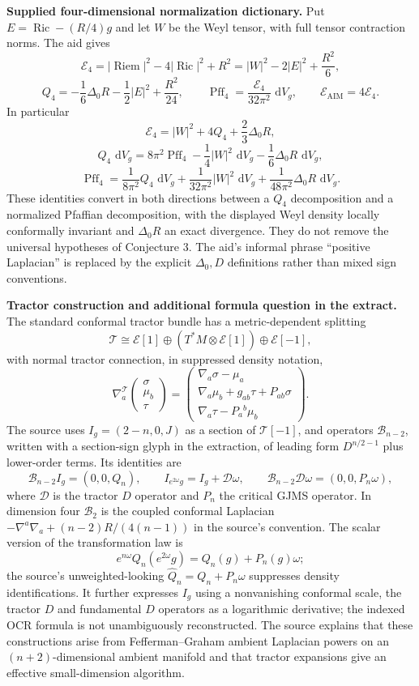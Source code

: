 \documentclass[11pt]{article}
\newcommand{\dd}{\,\mathrm{d}}
\begin{document}
\textbf{Supplied four-dimensional normalization dictionary.} Put $E=\operatorname{Ric}-(R/4)g$ and let $W$ be the Weyl tensor, with full tensor contraction norms. The aid gives
\[
 \mathcal E_4=|\operatorname{Riem}|^2-4|\operatorname{Ric}|^2+R^2
             =|W|^2-2|E|^2+\frac{R^2}{6},
\]
\[
 Q_4=-\frac16\Delta_0R-\frac12|E|^2+\frac{R^2}{24},\qquad
 \operatorname{Pff}_4=\frac{\mathcal E_4}{32\pi^2}\,\dd V_g,
 \qquad \mathcal E_{\mathrm{AIM}}=4\mathcal E_4.
\]
In particular
\[
 \mathcal E_4=|W|^2+4Q_4+\frac23\Delta_0R,
\]
\[
 Q_4\,\dd V_g=8\pi^2\operatorname{Pff}_4
       -\frac14|W|^2\,\dd V_g-\frac16\Delta_0R\,\dd V_g,
\]
\[
 \operatorname{Pff}_4=\frac1{8\pi^2}Q_4\,\dd V_g
       +\frac1{32\pi^2}|W|^2\,\dd V_g
       +\frac1{48\pi^2}\Delta_0R\,\dd V_g.
\]
These identities convert in both directions between a $Q_4$ decomposition and a normalized Pfaffian decomposition, with the displayed Weyl density locally conformally invariant and $\Delta_0R$ an exact divergence. They do not remove the universal hypotheses of Conjecture 3. The aid's informal phrase ``positive Laplacian'' is replaced by the explicit $\Delta_0,D$ definitions rather than mixed sign conventions.

\textbf{Tractor construction and additional formula question in the extract.} The standard conformal tractor bundle has a metric-dependent splitting
\[
 \mathcal T\cong\mathcal E[1]\oplus(T^*M\otimes\mathcal E[1])
                         \oplus\mathcal E[-1],
\]
with normal tractor connection, in suppressed density notation,
\[
 \nabla_a^{\mathcal T}\begin{pmatrix}\sigma\\\mu_b\\\tau\end{pmatrix}
 =\begin{pmatrix}
 \nabla_a\sigma-\mu_a\\
 \nabla_a\mu_b+g_{ab}\tau+P_{ab}\sigma\\
 \nabla_a\tau-P_a{}^b\mu_b
 \end{pmatrix}.
\]
The source uses $I_g=(2-n,0,J)$ as a section of $\mathcal T[-1]$, and operators $\mathcal B_{n-2}$, written with a section-sign glyph in the extraction, of leading form $D^{n/2-1}$ plus lower-order terms. Its identities are
\[
 \mathcal B_{n-2}I_g=(0,0,Q_n),\qquad
 I_{e^{2\omega}g}=I_g+\mathcal D\omega,\qquad
 \mathcal B_{n-2}\mathcal D\omega=(0,0,P_n\omega),
\]
where $\mathcal D$ is the tractor $D$ operator and $P_n$ the critical GJMS operator. In dimension four $\mathcal B_2$ is the coupled conformal Laplacian $-\nabla^a\nabla_a+(n-2)R/(4(n-1))$ in the source's convention. The scalar version of the transformation law is
\[
 e^{n\omega}Q_n(e^{2\omega}g)=Q_n(g)+P_n(g)\omega;
\]
the source's unweighted-looking $\widehat Q_n=Q_n+P_n\omega$ suppresses density identifications. It further expresses $I_g$ using a nonvanishing conformal scale, the tractor $D$ and fundamental $D$ operators as a logarithmic derivative; the indexed OCR formula is not unambiguously reconstructed. The source explains that these constructions arise from Fefferman--Graham ambient Laplacian powers on an $(n+2)$-dimensional ambient manifold and that tractor expansions give an effective small-dimension algorithm.
\end{document}
